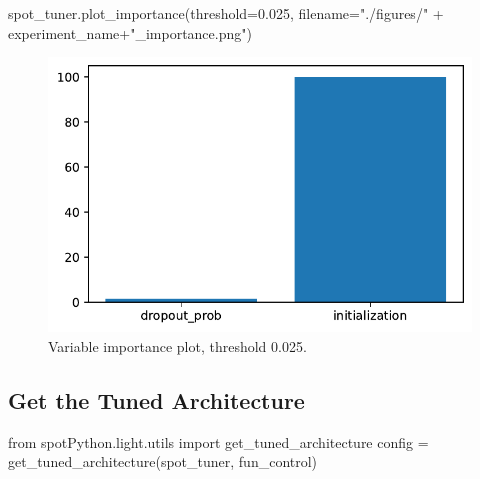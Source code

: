 \documentclass[
  letterpaper,
  DIV=11,
  numbers=noendperiod]{scrreprt}
\newenvironment{Shaded}{\begin{snugshade}}{\end{snugshade}}
\newcommand{\FloatTok}[1]{\textcolor[rgb]{0.68,0.00,0.00}{#1}}
\newcommand{\ImportTok}[1]{\textcolor[rgb]{0.00,0.46,0.62}{#1}}
\newcommand{\NormalTok}[1]{\textcolor[rgb]{0.00,0.23,0.31}{#1}}
\newcommand{\OperatorTok}[1]{\textcolor[rgb]{0.37,0.37,0.37}{#1}}
\newcommand{\StringTok}[1]{\textcolor[rgb]{0.13,0.47,0.30}{#1}}
\begin{document}
\begin{Shaded}
\begin{Highlighting}[]
\NormalTok{spot\_tuner.plot\_importance(threshold}\OperatorTok{=}\FloatTok{0.025}\NormalTok{,}
\NormalTok{    filename}\OperatorTok{=}\StringTok{"./figures/"} \OperatorTok{+}\NormalTok{ experiment\_name}\OperatorTok{+}\StringTok{"\_importance.png"}\NormalTok{)}
\end{Highlighting}
\end{Shaded}

\begin{figure}[H]

{\centering \includegraphics{31_spot_lightning_csv_files/figure-pdf/cell-15-output-1.pdf}

}

\caption{Variable importance plot, threshold 0.025.}

\end{figure}

\hypertarget{sec-get-spot-results-31}{%
\subsection{Get the Tuned Architecture}\label{sec-get-spot-results-31}}

\begin{Shaded}
\begin{Highlighting}[]
\ImportTok{from}\NormalTok{ spotPython.light.utils }\ImportTok{import}\NormalTok{ get\_tuned\_architecture}
\NormalTok{config }\OperatorTok{=}\NormalTok{ get\_tuned\_architecture(spot\_tuner, fun\_control)}
\end{Highlighting}
\end{Shaded}
\end{document}
